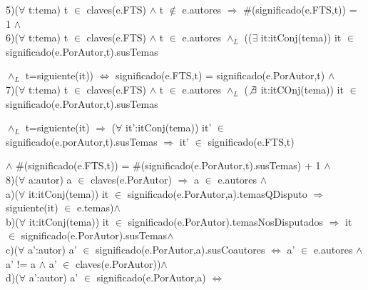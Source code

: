 \documentclass{article}
\begin{document}
\hspace{1cm}5)($\forall$ t:tema) t $\in$ claves(e.FTS) $\wedge$ t $\notin$ e.autores $\Rightarrow$ $\#$(significado(e.FTS,t)) = 1 $\wedge$
\\
 
\hspace{1cm}6)($\forall$ t:tema) t $\in$ claves(e.FTS) $\wedge$ t $\in$ e.autores $\wedge_{L}$ (($\exists$ it:itConj(tema)) it $\in$ significado(e.PorAutor,t).susTemas 

\hspace{1cm} $\wedge_{L}$ t=siguiente(it)) $\Leftrightarrow$ significado(e.FTS,t) = significado(e.PorAutor,t) $\wedge$
\\

\hspace{1cm}7)($\forall$ t:tema) t $\in$ claves(e.FTS) $\wedge$ t $\in$ e.autores $\wedge_{L}$ ($\not\exists$ it:itCOnj(tema)) it $\in$ significado(e.PorAutor,t).susTemas 

\hspace{1cm} $\wedge_{L}$ t=siguiente(it) $\Rightarrow$ ($\forall$ it':itConj(tema)) it' $\in$ significado(e.porAutor,t).susTemas $\Rightarrow$ it' $\in$ significado(e.FTS,t)

\hspace{1cm} $\wedge$  $\#$(significado(e.FTS,t)) = $\#$(significado(e.PorAutor,t).susTemas) + 1 $\wedge$
\\

\hspace{1cm}8)($\forall$ a:autor) a $\in$ claves(e.PorAutor) $\Rightarrow$ a $\in$ e.autores $\wedge$
\\

\hspace{1.2cm}a)($\forall$ it:itConj(tema)) it $\in$ significado(e.PorAutor,a).temasQDisputo 
$\Rightarrow$ siguiente(it) $\in$ e.temas)$\wedge$
\\

\hspace{1.2cm}b)($\forall$ it:itConj(tema)) it $\in$ significado(e.PorAutor).temasNosDisputados $\Rightarrow$ it $\in$ significado(e.PorAutor).susTemas$\wedge$
\\

\hspace{1.2cm}c)($\forall$ a':autor) a' $\in$ significado(e.PorAutor,a).susCoautores $\Leftrightarrow$ a' $\in$ e.autores $\wedge$ a' != a $\wedge$ a' $\in$ claves(e.PorAutor))$\wedge$
\\

\hspace{1.2cm}d)($\forall$ a':autor) a' $\in$ significado(e.PorAutor,a) $\Leftrightarrow$
\end{document}
